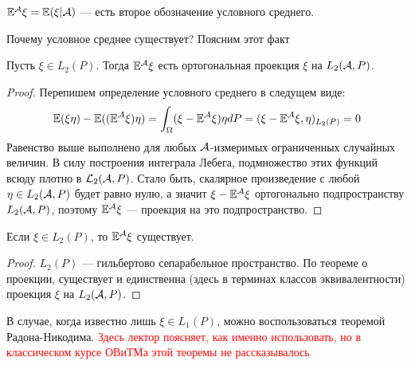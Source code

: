 \begin{note}
	$\mathbb{E}^{\mathcal{A}}\xi = \mathbb{E}(\xi | \mathcal{A})$ --- есть второе обозначение условного среднего.
\end{note}

\begin{note}
	Почему условное среднее существует? Поясним этот факт
\end{note}

\begin{proposition}
	Пусть $\xi \in L_2(P)$. Тогда $\mathbb{E}^{\mathcal{A}} \xi$ есть ортогональная проекция $\xi$ на $L_2(\mathcal{A}, P)$.
\end{proposition}

\begin{proof}
	Перепишем определение условного среднего в следущем виде:
	\[
		\mathbb{E}(\xi\eta) - \mathbb{E}((\mathbb{E}^{\mathcal{A}}\xi)\eta) = \int_\Omega (\xi - \mathbb{E}^{\mathcal{A}}\xi)\eta dP = (\xi - \mathbb{E}^{\mathcal{A}}\xi, \eta)_{L_2(P)} = 0
	\]
	Равенство выше выполнено для любых $\mathcal{A}$-измеримых ограниченных случайных величин. В силу построения интеграла Лебега, подмножество этих функций всюду плотно в $\mathcal{L}_2(\mathcal{A}, P)$. Стало быть, скалярное произведение с любой $\eta \in L_2(\mathcal{A}, P)$ будет равно нулю, а значит $\xi - \mathbb{E}^{\mathcal{A}} \xi$ ортогонально подпространству $L_2(\mathcal{A}, P)$, поэтому $\mathbb{E}^{\mathcal{A}} \xi$ --- проекция на это подпространство.
\end{proof}

\begin{corollary}
	Если $\xi \in L_2(P)$, то $\mathbb{E}^{\mathcal{A}}\xi$ существует.
\end{corollary}

\begin{proof}
	$L_2(P)$ --- гильбертово сепарабельное пространство. По теореме о проекции, существует и единственна (здесь в терминах классов эквивалентности) проекция $\xi$ на $L_2(\mathcal{A}, P)$.
\end{proof}

\begin{note}
	В случае, когда известно лишь $\xi \in L_1(P)$, можно воспользоваться теоремой Радона-Никодима. \textcolor{red}{Здесь лектор поясняет, как именно использовать, но в классическом курсе ОВиТМа этой теоремы не рассказывалось}
\end{note}

